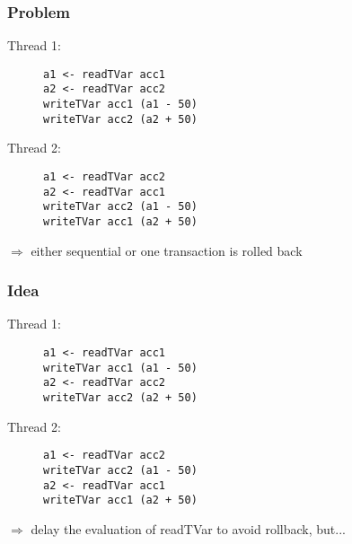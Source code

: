 \documentclass{beamer}
\begin{document}
    \begin{frame}[fragile]
    \frametitle{Problem}
    \fboxsep=0pt
    \noindent
    \begin{minipage}[t]{0.48\linewidth}
      Thread 1:
    \begin{figure}
     \begin{lstlisting}[frame=single]
a1 <- readTVar acc1
a2 <- readTVar acc2
writeTVar acc1 (a1 - 50)
writeTVar acc2 (a2 + 50)
     \end{lstlisting}
    \end{figure}
    \end{minipage}%
    \hfill%
    \begin{minipage}[t]{0.48\linewidth}
      Thread 2:
    \begin{figure}
     \begin{lstlisting}[frame=single]
a1 <- readTVar acc2
a2 <- readTVar acc1
writeTVar acc2 (a1 - 50)
writeTVar acc1 (a2 + 50)
     \end{lstlisting}
    \end{figure}
    \end{minipage}
    \vfill
    \pause
    $\Rightarrow$ either sequential or one transaction is rolled back
\end{frame}


    \begin{frame}[fragile]
    \frametitle{Idea}
    \fboxsep=0pt
    \noindent
    \begin{minipage}[t]{0.48\linewidth}
      Thread 1: 
          \begin{figure}
     \begin{lstlisting}[frame=single]
a1 <- readTVar acc1
writeTVar acc1 (a1 - 50)
a2 <- readTVar acc2
writeTVar acc2 (a2 + 50)
     \end{lstlisting}
    \end{figure}
    \end{minipage}%
    \hfill%
    \begin{minipage}[t]{0.48\linewidth}
      Thread 2:
          \begin{figure}
     \begin{lstlisting}[frame=single]
a1 <- readTVar acc2
writeTVar acc2 (a1 - 50)
a2 <- readTVar acc1
writeTVar acc1 (a2 + 50)
     \end{lstlisting}
    \end{figure}
    \end{minipage}
    \vfill
    \pause
    $\Rightarrow$ delay the evaluation of readTVar to avoid rollback, but...
\end{frame}
  
\end{document}
